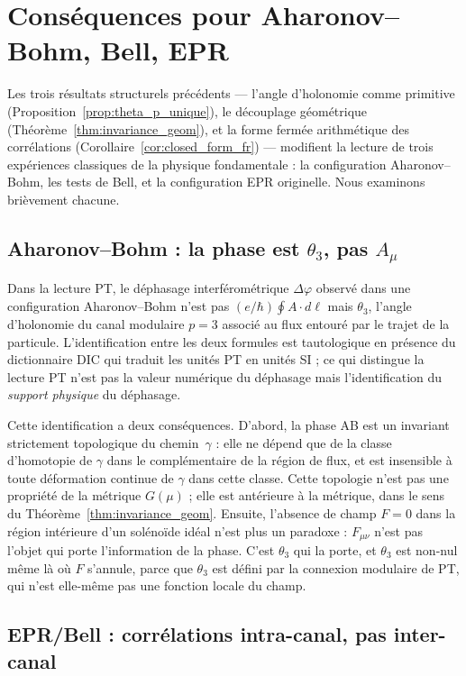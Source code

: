 \section{Conséquences pour Aharonov--Bohm, Bell, EPR}
\label{sec:consequences_bell_ab_epr}

Les trois résultats structurels précédents
--- l'angle d'holonomie comme primitive
(Proposition~\ref{prop:theta_p_unique}), le découplage géométrique
(Théorème~\ref{thm:invariance_geom}), et la forme fermée
arithmétique des corrélations
(Corollaire~\ref{cor:closed_form_fr}) --- modifient la lecture
de trois expériences classiques de la physique fondamentale : la
configuration Aharonov--Bohm, les tests de Bell, et la
configuration EPR originelle. Nous examinons brièvement chacune.

\subsection{Aharonov--Bohm : la phase est $\theta_3$, pas $A_\mu$}
\label{ssec:ab_consequence}

Dans la lecture PT, le déphasage interférométrique
$\Delta\varphi$ observé dans une configuration
Aharonov--Bohm \cite{AharonovBohm1959} n'est pas
$(e/\hbar) \oint A \cdot d\ell$ mais $\theta_3$, l'angle
d'holonomie du canal modulaire $p = 3$ associé au flux entouré
par le trajet de la particule. L'identification entre les deux
formules est tautologique en présence du dictionnaire DIC qui
traduit les unités PT en unités SI ; ce qui distingue la lecture
PT n'est pas la valeur numérique du déphasage mais l'identification
du \emph{support physique} du déphasage.

Cette identification a deux conséquences. D'abord, la phase AB
est un invariant strictement topologique du chemin~$\gamma$ :
elle ne dépend que de la classe d'homotopie de $\gamma$ dans le
complémentaire de la région de flux, et est insensible à toute
déformation continue de $\gamma$ dans cette classe. Cette
topologie n'est pas une propriété de la métrique $G(\mu)$ ; elle
est antérieure à la métrique, dans le sens du
Théorème~\ref{thm:invariance_geom}. Ensuite, l'absence de champ
$F = 0$ dans la région intérieure d'un solénoïde idéal n'est plus
un paradoxe : $F_{\mu\nu}$ n'est pas l'objet qui porte
l'information de la phase. C'est $\theta_3$ qui la porte, et
$\theta_3$ est non-nul même là où $F$ s'annule, parce que
$\theta_3$ est défini par la connexion modulaire de PT, qui
n'est elle-même pas une fonction locale du champ.

\subsection{EPR/Bell : corrélations intra-canal, pas inter-canal}
\label{ssec:bell_consequence}

